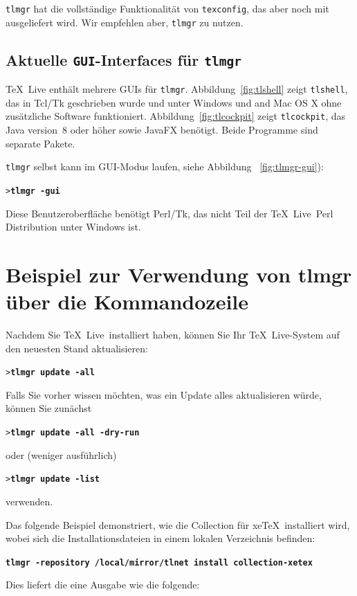 \documentclass[12pt,ngerman,a4paper,fullparskip]{report}
\newcommand{\TL}{\TeX\ Live\xspace}
\newcommand{\cmdname}[1]{\texttt{#1}}
\newcommand{\prog}[1]{\texttt{#1}}
\newcommand{\Ucom}[1]{\textbf{\texttt{#1}}}
\providecommand*{\XeTeX}{xe\TeX\xspace}
\begin{document}
\prog{tlmgr} hat die vollständige Funktionalität von \prog{texconfig}, das aber noch mit ausgeliefert wird. Wir empfehlen aber, \prog{tlmgr} zu nutzen.

\subsection{Aktuelle \texttt{GUI}-Interfaces für \cmdname{tlmgr}}

\TL{} enthält mehrere GUIs für \prog{tlmgr}. Abbildung~\ref{fig:tlshell} zeigt \cmdname{tlshell},
das in Tcl/Tk geschrieben wurde und unter Windows und 
and Mac OS X ohne zusätzliche Software funktioniert. Abbildung~\ref{fig:tlcockpit} zeigt \prog{tlcockpit}, das Java version~8 oder höher sowie JavaFX benötigt. Beide Programme sind separate Pakete.

\prog{tlmgr} selbst kann im GUI-Modus laufen, siehe Abbildung
~\ref{fig:tlmgr-gui}):

\begin{alltt}
> \Ucom{tlmgr -gui}
\end{alltt}

Diese Benutzeroberfläche benötigt Perl/Tk, das nicht Teil der \TL\ Perl Distribution unter Windows ist.

\section{Beispiel zur Verwendung von tlmgr über die Kommandozeile}


Nachdem Sie \TL\ installiert haben, können Sie Ihr \TL-System auf den
neuesten Stand aktualisieren:
\begin{alltt}
> \Ucom{tlmgr update -all}
\end{alltt}
Falls Sie vorher wissen möchten, was ein Update alles aktualisieren würde, können Sie zunächst
\begin{alltt}
> \Ucom{tlmgr update -all -dry-run}
\end{alltt}
oder (weniger ausführlich)
\begin{alltt}
> \Ucom{tlmgr update -list}
\end{alltt}
verwenden.

Das folgende Beispiel demonstriert, wie die Collection für \XeTeX\ installiert
wird, wobei sich die Installationsdateien in einem lokalen Verzeichnis
befinden:
 
\begin{alltt}
\Ucom{tlmgr -repository /local/mirror/tlnet install collection-xetex}
\end{alltt}
Dies liefert die eine  Ausgabe wie die folgende:
\end{document}
